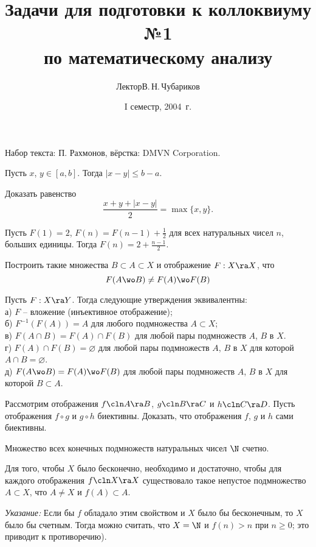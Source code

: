 \documentclass[a4paper]{article}
\title{Задачи для подготовки к коллоквиуму №1\\ по математическому анализу}
\author{Лектор\т В.\,Н.\,Чубариков}
\date{I семестр, 2004~г.}
\begin{document}
\maketitle
\centerline{\footnotesize Набор текста: П. Рахмонов, вёрстка: DMVN Corporation.}

\begin{nums}{-1}
\item Пусть $x$, $y\in[a, b]$. Тогда $|x-y|\le b-a$.
\item  Доказать равенство
$$
\frac{x+y+|x-y|}{2}=\max\{x, y\}.
$$

\item Пусть $F(1)=2$, $F(n)=F(n-1)+\frac{1}{2}$ для всех
натуральных чисел $n$, больших единицы. Тогда
$F(n)=2+\frac{n-1}{2}$.

\item Построить такие множества $B\subset A\subset X$ и
отображение $F: X\ra X$, что
$$
F(A\wo B)\neq F(A)\wo F(B)
$$

\item Пусть $F: X\ra Y$. Тогда следующие утверждения
эквивалентны:\\
а) $F$ -- вложение (инъективное отображение);\\
б) $F^{-1}(F(A))=A$ для любого подмножества $A\subset X$;\\
в) $F(A\cap B)=F(A)\cap F(B)$ для любой пары подмножеств $A$, $B$ в $X$.\\
г) $F(A)\cap F(B)=\varnothing$ для любой пары подмножеств $A$, $B$ в $X$ для которой $A\cap B=\varnothing$.\\
д) $F(A\wo B)=F(A)\wo F(B)$ для любой пары подмножеств $A$, $B$ в $X$ для которой $B\subset A$.

\item Рассмотрим отображения $f\cln A\ra B$, $g\cln B\ra C$ и $h\cln C\ra D$. Пусть отображения $f\circ g$ и $g\circ h$
биективны. Доказать, что отображения $f$, $g$ и $h$ сами биективны.

\item  Множество всех конечных подмножеств натуральных чисел $\N$ счетно.

\item  Для того, чтобы $X$ было бесконечно, необходимо и
достаточно, чтобы для каждого отображения $f\cln X\ra X$
существовало такое непустое подмножество $A\subset X$, что $A\neq
X$ и $f(A)\subset A$.

\emph{Указание:} Если бы $f$ обладало этим свойством и $X$ было
бы бесконечным, то $X$ было бы счетным. Тогда можно считать, что
$X=\N$ и $f(n)>n$ при $n\ge 0$; это приводит к
противоречию).


\end{nums}
\end{document}
